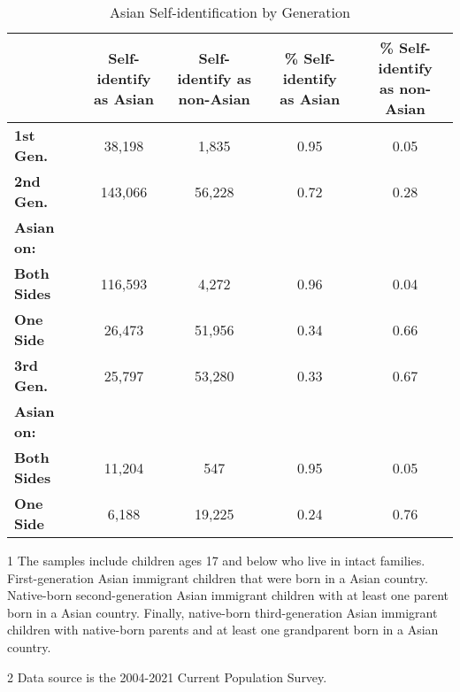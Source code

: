 \begin{table}[H]

\caption{Asian Self-identification by Generation \label{tab:hispbygen}}
\centering
\begin{threeparttable}
\begin{tabular}[t]{>{}lcccc}
\toprule
  & \specialcell{Self-identify \\ as Asian} & \specialcell{Self-identify as \\ non-Asian} & \specialcell{\% Self-identify \\ as Asian} & \specialcell{\% Self-identify \\ as non-Asian}\\
\midrule
\textbf{1st Gen.} & 38,198 & 1,835 & 0.95 & 0.05\\
\textbf{2nd Gen.} & 143,066 & 56,228 & 0.72 & 0.28\\
\hspace{1em}\textbf{Asian on:} &  &  &  \vphantom{1} & \\
\hspace{1em}\hspace{1em}\textbf{Both Sides} & 116,593 & 4,272 & 0.96 & 0.04\\
\hspace{1em}\hspace{1em}\textbf{One Side} & 26,473 & 51,956 & 0.34 & 0.66\\
\addlinespace
\textbf{3rd Gen.} & 25,797 & 53,280 & 0.33 & 0.67\\
\hspace{1em}\textbf{Asian on:} &  &  &  & \\
\hspace{1em}\hspace{1em}\textbf{Both Sides} & 11,204 & 547 & 0.95 & 0.05\\
\hspace{1em}\hspace{1em}\textbf{One Side} & 6,188 & 19,225 & 0.24 & 0.76\\
\bottomrule
\end{tabular}
\begin{tablenotes}
\item[1] The samples include children ages 17 and below who live in intact families. First-generation Asian immigrant children that were born in a Asian country. Native-born second-generation Asian immigrant children with at least one parent born in a Asian country. Finally, native-born third-generation Asian immigrant children with native-born parents and at least one grandparent born in a Asian country.
\item[2] Data source is the 2004-2021 Current Population Survey.
\end{tablenotes}
\end{threeparttable}
\end{table}
